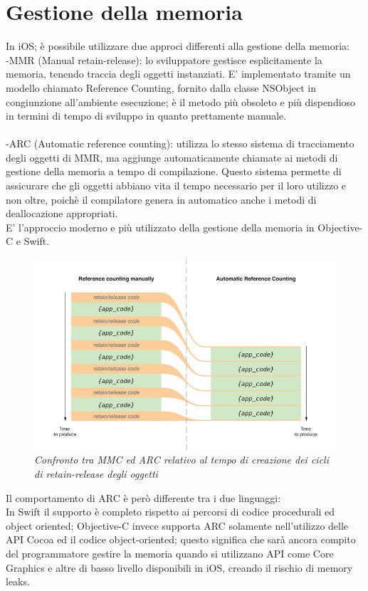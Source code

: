 \section{Gestione della memoria}
In iOS; è possibile utilizzare due approci differenti alla gestione della memoria:
\\-MMR (Manual retain-release): lo sviluppatore gestisce esplicitamente la memoria, tenendo traccia degli oggetti instanziati. E' implementato tramite un modello chiamato Reference Counting, fornito dalla classe NSObject in congiunzione all'ambiente esecuzione; è il metodo più obsoleto e più dispendioso in termini di tempo di sviluppo in quanto prettamente manuale.\\
\\-ARC (Automatic reference counting): utilizza lo stesso sistema di tracciamento degli oggetti di MMR, ma aggiunge automaticamente chiamate ai metodi di gestione della memoria a tempo di compilazione. Questo sistema permette di assicurare che gli oggetti abbiano vita il tempo necessario per il loro utilizzo e non oltre, poichè il compilatore genera in automatico anche i metodi di deallocazione appropriati.\\E' l'approccio moderno e più utilizzato della gestione della memoria in Objective-C e Swift.
\begin{figure}[H]
      \centering
      \includegraphics[scale=0.40]{immagini/ARC.jpg}
            \vspace{0.8cm}
            \caption{\textit{Confronto tra MMC ed ARC relativo al tempo di creazione dei cicli di retain-release degli oggetti}}
    \end{figure}
Il comportamento di ARC è però differente tra i due linguaggi:\\
In Swift il supporto è completo rispetto ai percorsi di codice procedurali ed object oriented; Objective-C invece supporta ARC solamente nell'utilizzo delle API Cocoa ed il codice object-oriented; questo significa che sarà ancora compito del programmatore gestire la memoria quando si utilizzano API come Core Graphics e altre di basso livello disponibili in iOS, creando il rischio di memory leaks.
